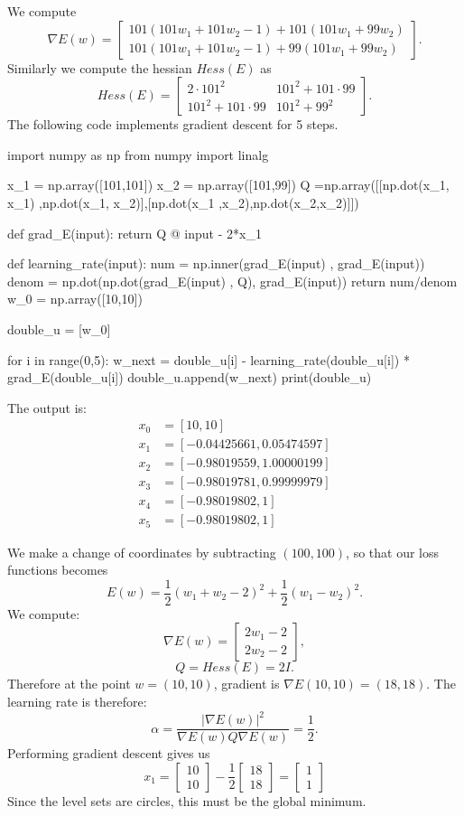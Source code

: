 \documentclass[12pt, a4paper]{article}
\theoremstyle{definition}
\newcommand{\grad}{\nabla}
\newcommand{\bmat}[1]{\begin{bmatrix}#1\end{bmatrix}}
\begin{document}
	We compute $$\grad E(w) = \bmat{101(101w_1 + 101w_2 - 1)  + 101(101w_1 + 99w_2) \\ 101(101w_1 + 101w_2 - 1)  + 99(101w_1 + 99 w_2)}.$$
Similarly we compute the hessian $Hess(E)$ as
$$Hess(E) = \bmat{2\cdot 101^2 & 101^2 + 101\cdot99\\ 101^2 + 101\cdot 99 & 101^2 + 99^2}.$$
The following code implements gradient descent for 5 steps. 
\begin{python}
import numpy as np
from numpy import linalg

x_1 = np.array([101,101])
x_2 = np.array([101,99])
Q =np.array([[np.dot(x_1, x_1) ,np.dot(x_1, x_2)],[np.dot(x_1 ,x_2),np.dot(x_2,x_2)]])

def grad_E(input):
	return Q @ input - 2*x_1 

def learning_rate(input):
	num = np.inner(grad_E(input) , grad_E(input))
	denom = np.dot(np.dot(grad_E(input) , Q), grad_E(input)) 
	return num/denom
w_0 = np.array([10,10])

double_u = [w_0]

for i in range(0,5):
    w_next = double_u[i] - learning_rate(double_u[i]) * grad_E(double_u[i])
    double_u.append(w_next)
print(double_u)
\end{python}
The output is:
\begin{align*}	
	x_0  & =  [10, 10]
	\\ x_1 & = [-0.04425661,  0.05474597]
	\\ x_2 & = [-0.98019559,  1.00000199]
	\\ x_3 & = [-0.98019781,  0.99999979]
	\\ x_4 & = [-0.98019802,  1]
	\\ x_5 & =[-0.98019802,  1]
\end{align*}
\item We make a change of coordinates by subtracting $(100,100)$, so that our loss functions becomes $$E(w) = \frac{1}{2} (w_1 + w_2 -2)^2  +\frac{1}{2} (w_1 - w_2) ^2.$$
We compute:
$$\grad E(w) = \bmat{  2w_1 - 2\\ 2w_2 - 2  },$$
$$Q = Hess(E) = 2I.$$
Therefore at the point $w = (10,10)$, gradient is $\grad E(10,10) = (18,18)$. The learning rate is therefore:
$$\alpha = \frac{|\grad E(w)|^2}{\grad E(w) Q \grad E(w)} = \frac{1}{2}.$$
Performing gradient descent gives us 
$$x_1 = \bmat{10 \\ 10} - \frac{1}{2}\bmat{18 \\ 18} = \bmat{1 \\ 1}$$
Since the level sets are circles, this must be the global minimum. 
\end{document}
